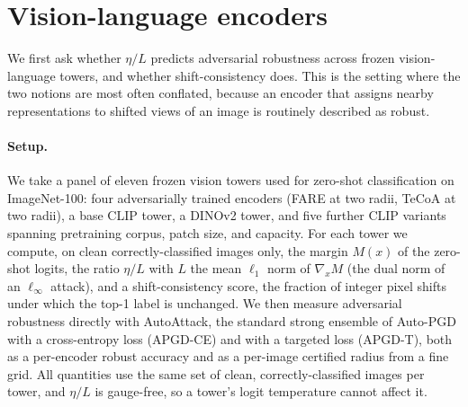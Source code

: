 \documentclass{article}
\newcommand{\etaL}{\ensuremath{\eta/L}}
\begin{document}
\section{Vision-language encoders}
\label{sec:vlm}
We first ask whether \etaL{} predicts adversarial robustness across frozen vision-language towers,
and whether shift-consistency does. This is the setting where the two notions are most often
conflated, because an encoder that assigns nearby representations to shifted views of an image is
routinely described as robust.

\paragraph{Setup.}
We take a panel of eleven frozen vision towers used for zero-shot classification on ImageNet-100:
four adversarially trained encoders (FARE at two radii, TeCoA at two radii), a base CLIP tower, a
DINOv2 tower, and five further CLIP variants spanning pretraining corpus, patch size, and capacity.
For each tower we compute, on clean correctly-classified images only, the margin $M(x)$ of the
zero-shot logits, the ratio \etaL{} with $L$ the mean $\ell_1$ norm of $\nabla_x M$ (the dual norm of
an $\ell_\infty$ attack), and a shift-consistency score, the fraction of integer pixel shifts under
which the top-1 label is unchanged. We then measure adversarial robustness directly with AutoAttack,
the standard strong ensemble of Auto-PGD with a cross-entropy loss (APGD-CE) and with a targeted loss
(APGD-T), both as a per-encoder robust accuracy and as a per-image certified radius from a fine grid. All quantities use the same set of clean, correctly-classified
images per tower, and \etaL{} is gauge-free, so a tower's logit temperature cannot affect it.
\end{document}

